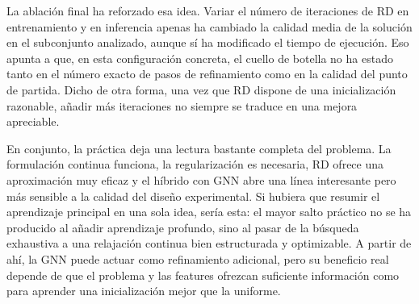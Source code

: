 \documentclass[11pt]{article}
\begin{document}
La ablación final ha reforzado esa idea. Variar el número de iteraciones
de RD en entrenamiento y en inferencia apenas ha cambiado la calidad
media de la solución en el subconjunto analizado, aunque sí ha
modificado el tiempo de ejecución. Eso apunta a que, en esta
configuración concreta, el cuello de botella no ha estado tanto en el
número exacto de pasos de refinamiento como en la calidad del punto de
partida. Dicho de otra forma, una vez que RD dispone de una
inicialización razonable, añadir más iteraciones no siempre se traduce
en una mejora apreciable.

En conjunto, la práctica deja una lectura bastante completa del
problema. La formulación continua funciona, la regularización es
necesaria, RD ofrece una aproximación muy eficaz y el híbrido con GNN
abre una línea interesante pero más sensible a la calidad del diseño
experimental. Si hubiera que resumir el aprendizaje principal en una
sola idea, sería esta: el mayor salto práctico no se ha producido al
añadir aprendizaje profundo, sino al pasar de la búsqueda exhaustiva a
una relajación continua bien estructurada y optimizable. A partir de
ahí, la GNN puede actuar como refinamiento adicional, pero su beneficio
real depende de que el problema y las features ofrezcan suficiente
información como para aprender una inicialización mejor que la uniforme.


    
    
    
\end{document}
